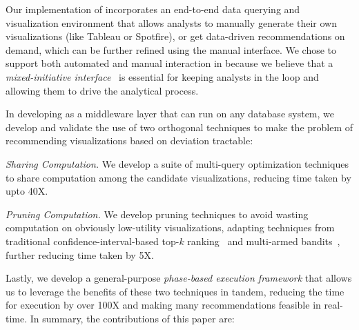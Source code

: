 Our implementation of \SeeDB incorporates an end-to-end data querying and 
visualization environment that allows analysts to manually generate 
their own visualizations (like Tableau or Spotfire), or get data-driven recommendations on demand, which
can be further refined using the manual interface.
We chose to support both automated and manual interaction in \SeeDB because we 
believe that a {\em mixed-initiative interface}~\cite{mixed_initiative} is essential for keeping 
analysts in the loop and allowing them to drive the analytical process.

In developing \SeeDB as a middleware layer that can run on any database system,
we develop and validate the use of  
two orthogonal techniques to make the problem of recommending visualizations based on deviation tractable:
\begin{denselist}
\item {\em Sharing Computation.} 
We develop a suite of multi-query optimization techniques to share computation
among the candidate visualizations,
reducing time taken by upto 40X.
\item {\em Pruning Computation.}
We develop pruning techniques to avoid wasting computation
on obviously low-utility visualizations, adapting
techniques from traditional 
  confidence-interval-based top-$k$ ranking~\cite{hoeffding1963probability} 
  and multi-armed bandits~\cite{bandits},
  further reducing time taken by 5X.
\end{denselist}
Lastly, we develop a general-purpose {\em phase-based execution framework}
that allows us to leverage the benefits of these two techniques
in tandem, reducing the time for execution by over 100X and
making many recommendations feasible in real-time.
In summary, the contributions of this paper are:

